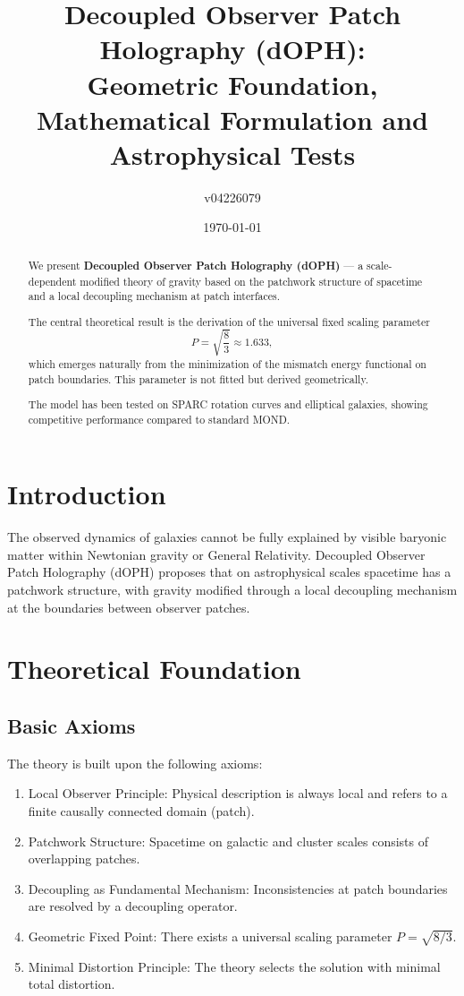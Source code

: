 \documentclass[12pt,a4paper]{article}
\title{Decoupled Observer Patch Holography (dOPH): \\
Geometric Foundation, Mathematical Formulation and Astrophysical Tests}
\author{v04226079}
\date{\today}
\begin{document}
\maketitle

\begin{abstract}
We present \textbf{Decoupled Observer Patch Holography (dOPH)} — a scale-dependent modified theory of gravity based on the patchwork structure of spacetime and a local decoupling mechanism at patch interfaces.

The central theoretical result is the derivation of the universal fixed scaling parameter 
\[
P = \sqrt{\frac{8}{3}} \approx 1.633,
\]
which emerges naturally from the minimization of the mismatch energy functional on patch boundaries. This parameter is not fitted but derived geometrically.

The model has been tested on SPARC rotation curves and elliptical galaxies, showing competitive performance compared to standard MOND.
\end{abstract}

\section{Introduction}

The observed dynamics of galaxies cannot be fully explained by visible baryonic matter within Newtonian gravity or General Relativity. Decoupled Observer Patch Holography (dOPH) proposes that on astrophysical scales spacetime has a patchwork structure, with gravity modified through a local decoupling mechanism at the boundaries between observer patches.

\section{Theoretical Foundation}

\subsection{Basic Axioms}

The theory is built upon the following axioms:
\begin{enumerate}
\item Local Observer Principle: Physical description is always local and refers to a finite causally connected domain (patch).
\item Patchwork Structure: Spacetime on galactic and cluster scales consists of overlapping patches.
\item Decoupling as Fundamental Mechanism: Inconsistencies at patch boundaries are resolved by a decoupling operator.
\item Geometric Fixed Point: There exists a universal scaling parameter \(P = \sqrt{8/3}\).
\item Minimal Distortion Principle: The theory selects the solution with minimal total distortion.
\end{enumerate}
\end{document}
